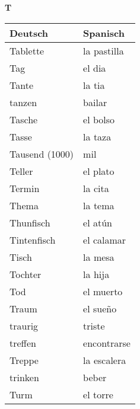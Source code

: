 \begin{flushright}\begin{Huge}\textbf{T}\end{Huge}\end{flushright}

\begin{longtable}{p{} p{}} 
\textbf{Deutsch}     & \textbf{Spanisch}                                       \\ \hline
\hline
\endhead %
Tablette & la pastilla\\
Tag & el dia \\
Tante & la tia\\
tanzen & bailar\\
Tasche & el bolso\\
Tasse & la taza\\
Tausend (1000) & mil\\
Teller & el plato\\
Termin & la cita\\
Thema & la tema\\
Thunfisch & el atún\\
Tintenfisch & el calamar\\
Tisch & la mesa\\
Tochter & la hija\\
Tod & el muerto\\
Traum & el sueño\\
traurig & triste \\
treffen & encontrarse\\
Treppe & la escalera\\
trinken & beber\\
Turm & el torre\\

\end{longtable}
